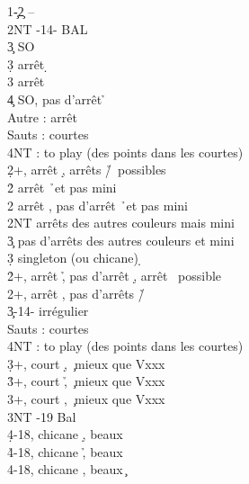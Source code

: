 \documentclass[a4paper]{article}
\begin{document}
\begin{bidtable}
1\c-2\c \> --\\
2NT -14- BAL\+\\
3\c \> SO\\
3\d \> arrêt \d \+\\
3\s \> arrêt \s \+\\
4\c \> SO, pas d'arrêt \h \-\-\\
Autre \> : arrêt\\
Sauts \> : courtes\+\\
4NT \> : to play (des points dans les courtes)\-\-\\
2\d {}+, arrêt \d , arrêts \h /\s\ possibles\+\\
2\h \> arrêt \h\ et pas mini\\
2\s \> arrêt \s , pas d'arrêt \h\ et pas mini\\
2NT \> arrêts des autres couleurs mais mini\\
3\c \> pas d'arrêts des autres couleurs et mini\\
3\d \> singleton (ou chicane) \d \-\\
2\h {}+, arrêt \h , pas d'arrêt \d , arrêt \s\ possible\\
2\s {}+, arrêt \s , pas d'arrêts \h /\d \\
3\c {}-14- irrégulier\+\\
Sauts \> : courtes\+\\
4NT \> : to play (des points dans les courtes)\-\-\\
3\d {}+, court \d , \c\ mieux que Vxxx\\
3\h {}+, court \h , \c\ mieux que Vxxx\\
3\s {}+, court \s , \c\ mieux que Vxxx\\
3NT -19 Bal\\
4\d {}-18, chicane \d , beaux \c \\
4\h {}-18, chicane \h , beaux \c \\
4\s {}-18, chicane \s , beaux \c 
\end{bidtable}
\end{document}
